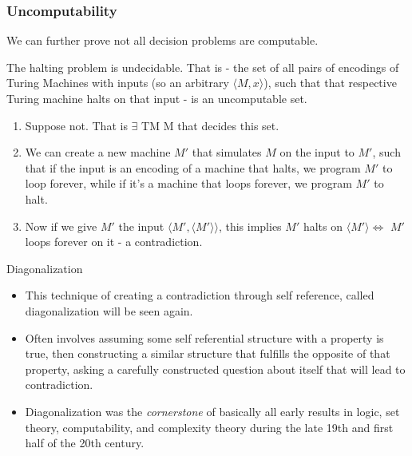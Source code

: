 \documentclass[aspectratio=169]{beamer}
\begin{document}
\begin{frame}
  \frametitle{Uncomputability}
  \item We can further prove not all decision problems are computable. 
  \begin{thrm}
    The halting problem is undecidable. That is - the set of all pairs of encodings of Turing Machines with inputs (so an arbitrary $\langle M, x\rangle$), such that that respective Turing machine halts on that input - is an uncomputable set. 
  \end{thrm}
  \pause
  \begin{pf}
    \begin{enumerate}
        \item Suppose not. That is $\exists$ TM M that decides this set. \pause
        \item We can create a new machine $M'$ that simulates $M$ on the input to $M'$, such that if the input is an encoding of a machine that halts, we program $M'$ to loop forever, while if it's a machine that loops forever, we program $M'$ to halt. \pause
        \item Now if we give $M'$ the input $\langle M', \langle M' \rangle \rangle$, this implies $M'$ halts on $\langle M' \rangle \Leftrightarrow$ $M'$ loops forever on it - a contradiction.
    \end{enumerate}
  \end{pf}
\end{frame}

\begin{frame}{Diagonalization}
  
  \begin{itemize}
    \item This technique of creating a contradiction through self reference, called diagonalization will be seen again. \pause
    \item Often involves assuming some self referential structure with a property is true, then constructing a similar structure that fulfills the opposite of that property, asking a carefully constructed question about itself that will lead to contradiction. \pause
    \item Diagonalization was the \emph{cornerstone} of basically all early results in logic, set theory, computability, and complexity theory during the late 19th and first half of the 20th century. 
  \end{itemize}
\end{frame}
\end{document}
